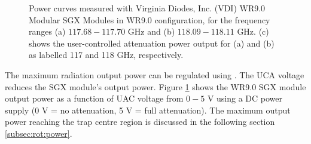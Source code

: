 \begin{figure}[!htb]
    \hfill
    \caption{Power curves measured with Virginia Diodes, Inc. (VDI) WR9.0 Modular SGX Modules in WR9.0 configuration, for the frequency ranges (a) $117.68-117.70$ GHz and (b) $118.09-118.11$ GHz. (c) shows the user-controlled attenuation power output for (a) and (b) as labelled 117 and 118 GHz, respectively. }
    \label{fig:power-attenuation}
\end{figure}

The maximum radiation output power can be regulated using . The UCA voltage reduces the SGX module's output power. Figure \ref{fig:power-attenuation} shows the WR9.0 SGX module output power as a function of UAC voltage from  $0-5$ V using a DC power supply (0 V = no attenuation, 5 V = full attenuation). The maximum output power reaching the trap centre region is discussed in the following section \ref{subsec:rot:power}.

\clearpage

